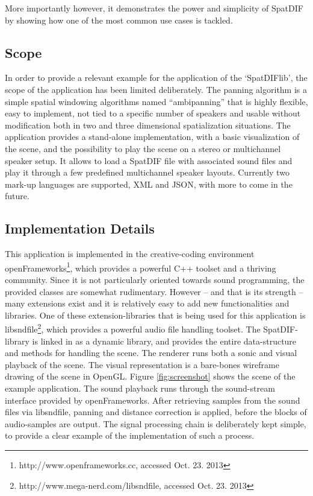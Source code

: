 \documentclass[a4paper]{article}
\begin{document}
More importantly however, it demonstrates the power and simplicity of SpatDIF by showing how one of the most common use cases is tackled.

\subsection{Scope}

In order to provide a relevant example for the application of the `SpatDIFlib', the scope of the application has been limited deliberately.
The panning algorithm is a simple spatial windowing algorithms named ``ambipanning'' \cite{Neukom:2008ambipan} that %
is highly flexible, easy to implement, not tied to a specific number of speakers and usable without modification both in two and three dimensional spatialization situations.
The application provides a stand-alone implementation, with a basic visualization of the scene, and the possibility to play the scene on a stereo or multichannel speaker setup.
It allows to load a SpatDIF file with associated sound files and play it through a few predefined multichannel speaker layouts.
Currently two mark-up languages are supported, XML and JSON, with more to come in the future.

\subsection{Implementation Details}

This application is implemented in the creative-coding environment openFrameworks\footnote{http://www.openframeworks.cc, accessed Oct. 23. 2013}, which provides a powerful C++ toolset and a thriving community.
Since it is not particularly oriented towards sound programming, the provided classes are somewhat rudimentary.
However -- and that is its strength -- many extensions exist and it is relatively easy to add new functionalities and libraries.
One of these extension-libraries that is being used for this application is libsndfile\footnote{http://www.mega-nerd.com/libsndfile, accessed Oct. 23. 2013}, which provides a powerful audio file handling toolset.
The SpatDIF-library is linked in as a dynamic library, and provides the entire data-structure and methods for handling the scene.
The renderer runs both a sonic and visual playback of the scene.
The visual representation is a bare-bones wireframe drawing of the scene in OpenGL.
Figure \ref{fig:screenshot} shows the scene of the example application.
The sound playback runs through the sound-stream interface provided by openFrameworks.
After retrieving samples from the sound files via libsndfile, panning and distance correction is applied, before the blocks of audio-samples are output.
The signal processing chain is deliberately kept simple, to provide a clear example of the implementation of such a process.
\end{document}
